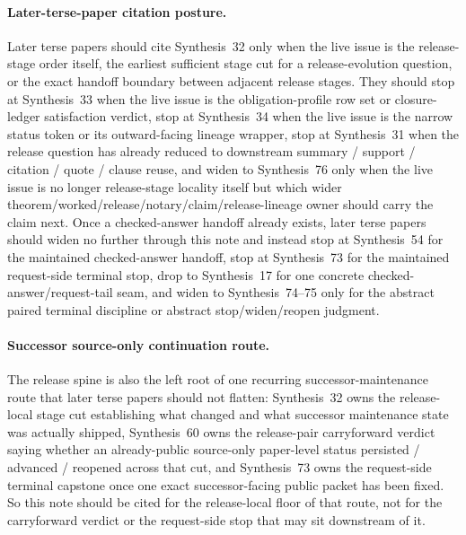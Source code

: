\documentclass[11pt]{article}
\begin{document}
\paragraph{Later-terse-paper citation posture.} Later terse papers should cite Synthesis~32 only when the live issue is the release-stage order itself, the earliest sufficient stage cut for a release-evolution question, or the exact handoff boundary between adjacent release stages. They should stop at Synthesis~33 when the live issue is the obligation-profile row set or closure-ledger satisfaction verdict, stop at Synthesis~34 when the live issue is the narrow status token or its outward-facing lineage wrapper, stop at Synthesis~31 when the release question has already reduced to downstream summary / support / citation / quote / clause reuse, and widen to Synthesis~76 only when the live issue is no longer release-stage locality itself but which wider theorem/worked/release/notary/claim/release-lineage owner should carry the claim next. Once a checked-answer handoff already exists, later terse papers should widen no further through this note and instead stop at Synthesis~54 for the maintained checked-answer handoff, stop at Synthesis~73 for the maintained request-side terminal stop, drop to Synthesis~17 for one concrete checked-answer/request-tail seam, and widen to Synthesis~74--75 only for the abstract paired terminal discipline or abstract stop/widen/reopen judgment.\cite{series:releaseclosure,series:statusenvelopes,series:downstreamnormalforms,series:challengeanswerreviewmenus,series:pairedterminalcitationdiscipline,series:pairedterminalcutoverrules,series:theoremtopublicationspine,series:workedexample}

\paragraph{Successor source-only continuation route.} The release spine is also the left root of one recurring successor-maintenance route that later terse papers should not flatten: Synthesis~32 owns the release-local stage cut establishing what changed and what successor maintenance state was actually shipped, Synthesis~60 owns the release-pair carryforward verdict saying whether an already-public source-only paper-level status persisted / advanced / reopened across that cut, and Synthesis~73 owns the request-side terminal capstone once one exact successor-facing public packet has been fixed. So this note should be cited for the release-local floor of that route, not for the carryforward verdict or the request-side stop that may sit downstream of it.\cite{series:publicrequestcarryforward,series:publicrequestresponsepacketrefreshresponsepacketclosureverdicts}
\end{document}
